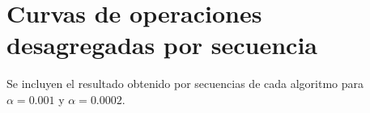 \chapter{Curvas de operaciones desagregadas por secuencia}\label{chap:Apendice_2}

Se incluyen el resultado obtenido por secuencias de cada algoritmo para $\alpha=0.001$ y $\alpha=0.0002$.




